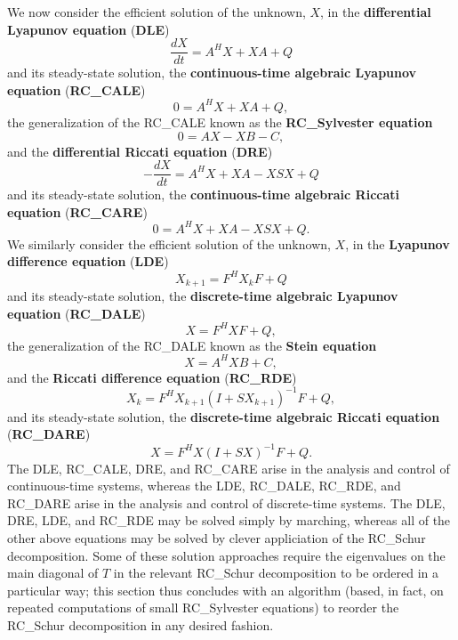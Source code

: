 We now consider the efficient solution of the unknown, $X$, in the {\bf differential Lyapunov equation} ({\bf DLE})
\begin{equation*}
\frac{dX}{dt} = A^H X + X A + Q
\end{equation*}
and its steady-state solution, the {\bf continuous-time algebraic Lyapunov equation} ({\bf RC_CALE})
\begin{equation*}
0 = A^H X + X A + Q,
\end{equation*}
the generalization of the RC_CALE known as the {\bf RC_Sylvester equation}
\begin{equation*}
0= A X - X B - C,
\end{equation*}
and the {\bf differential Riccati equation} ({\bf DRE})
\begin{equation*}
- \frac{d X}{dt} = A^H X + X A - X S X + Q
\end{equation*}
and its steady-state solution, the {\bf continuous-time algebraic Riccati equation} ({\bf RC_CARE})
\begin{equation*}
0 = A^H X + X A - X S X + Q.
\end{equation*}
We similarly consider the efficient solution of the unknown, $X$, in the {\bf Lyapunov difference equation} ({\bf LDE})
\begin{equation*}
X_{k+1} = F^H X_k F + Q
\end{equation*}
and its steady-state solution, the {\bf discrete-time algebraic Lyapunov equation} ({\bf RC_DALE})
\begin{equation*}
X = F^H X F + Q,
\end{equation*}
the generalization of the RC_DALE known as the {\bf Stein equation}
\begin{equation*}
X = A^H X B + C,
\end{equation*}
and the {\bf Riccati difference equation} ({\bf RC_RDE})
\begin{equation*}
  X_k = F^H X_{k+1} (I+ S X_{k+1})^{-1} F + Q, 
\end{equation*}
and its steady-state solution, the {\bf discrete-time algebraic Riccati equation} ({\bf RC_DARE})
\begin{equation*}
X = F^H X (I+ S X)^{-1} F + Q.
\end{equation*}
The DLE, RC_CALE, DRE, and RC_CARE arise in the analysis and control of continuous-time systems, whereas
the LDE, RC_DALE, RC_RDE, and RC_DARE arise in the analysis and control of discrete-time systems.
The DLE, DRE, LDE, and RC_RDE may be solved simply by marching, whereas all of the other above equations may be solved by clever appliciation
of the RC_Schur decomposition. Some of these solution approaches require the eigenvalues on the main diagonal of $T$ in
the relevant RC_Schur decomposition to be ordered in a particular way; this section thus concludes with an algorithm (based, in fact, on
repeated computations of small RC_Sylvester equations) to reorder the RC_Schur decomposition in any desired fashion.

